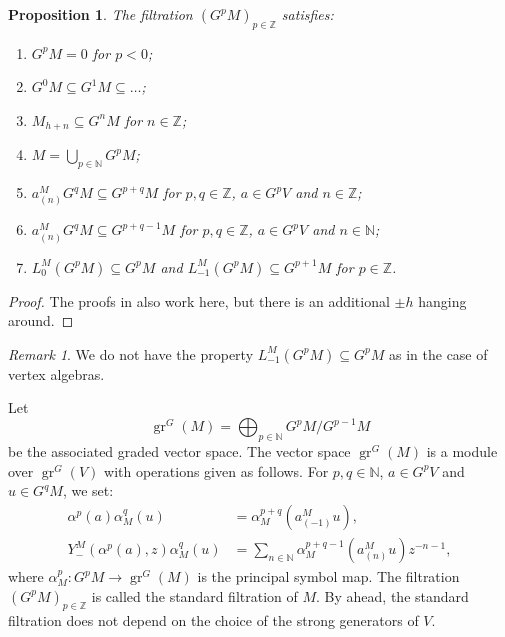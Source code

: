 \documentclass[a4paper, 12pt, reqno]{amsart}
\newtheorem{proposition}[theorem]{Proposition}
\theoremstyle{remark}
\newtheorem{remark}[theorem]{Remark}
\numberwithin{equation}{subsection}
\DeclareMathOperator{\gr}{gr}
\begin{document}
\begin{proposition}
  \label{prp:14}
  The filtration $(G^pM)_{p \in \mathbb{Z}}$ satisfies:
  \begin{enumerate}
  \item $G^pM = 0$ for $p < 0$;
  \item $G^0M \subseteq G^1M \subseteq \dots$;
  \item $M_{h + n} \subseteq G^nM$ for $n \in \mathbb{Z}$;
  \item $M = \bigcup_{p \in \mathbb{N}}G^pM$;
  \item $a^M_{(n)}G^qM \subseteq G^{p + q}M$ for $p, q \in \mathbb{Z}$, $a \in G^pV$ and $n \in \mathbb{Z}$;
  \item $a^M_{(n)}G^qM \subseteq G^{p + q - 1}M$ for $p, q \in \mathbb{Z}$, $a \in G^pV$ and $n \in \mathbb{N}$;
  \item $L^M_0(G^pM) \subseteq G^pM$ and $L^M_{-1}(G^pM) \subseteq G^{p + 1}M$ for $p \in \mathbb{Z}$.
  \end{enumerate}
\end{proposition}

\begin{proof}
  The proofs in \cite{li_vertex_2004} also work here, but there is an additional $\pm h$ hanging around.
\end{proof}

\begin{remark}
  \label{rmk:40}
  We do not have the property $L_{-1}^M(G^pM) \subseteq G^pM$ as in the case of vertex algebras.
\end{remark}

Let
\begin{equation*}
  \gr^G(M) = \bigoplus_{p \in \mathbb{N}}G^pM/G^{p - 1}M
\end{equation*}
be the associated graded vector space.
The vector space $\gr^G(M)$ is a module over $\gr^G(V)$ with operations given as follows.
For $p, q \in \mathbb{N}$, $a \in G^pV$ and $u \in G^qM$, we set:
\begin{align*}
  \alpha^p(a)\alpha_M^q(u) &= \alpha_M^{p + q}(a^M_{(-1)}u), \\
  Y^M_-(\alpha^p(a), z)\alpha_M^q(u) &= \sum_{n \in \mathbb{N}}\alpha_M^{p + q - 1}(a^M_{(n)}u)z^{-n - 1},
\end{align*}
where $\alpha_M^p: G^pM \to \gr^G(M)$ is the principal symbol map.
The filtration $(G^pM)_{p \in \mathbb{Z}}$ is called the standard filtration of $M$.
By  ahead, the standard filtration does not depend on the choice of the strong generators of $V$.
\end{document}
